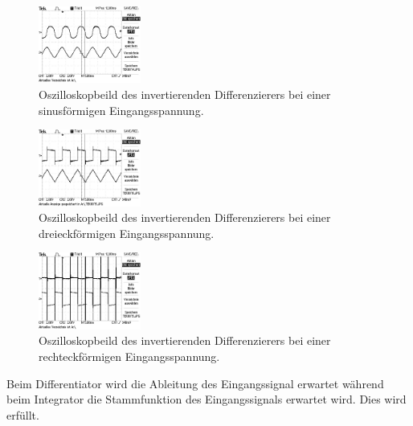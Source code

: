   \begin{figure}
    \centering
    \includegraphics[width=0.3\textwidth,angle=90]{content/grafiken/invertierenderDifferenzierer/TEK0014.JPG}
    \caption{Oszilloskopbeild des invertierenden Differenzierers bei einer sinusförmigen Eingangsspannung.}
    \label{fig:sinusII}
  \end{figure}
  \begin{figure}
    \centering
    \includegraphics[width=0.3\textwidth,angle=90]{content/grafiken/invertierenderDifferenzierer/TEK0016.JPG}
    \caption{Oszilloskopbeild des invertierenden Differenzierers bei einer dreieckförmigen Eingangsspannung.}
    \label{fig:dreieckII}
  \end{figure}
  \begin{figure}
    \centering
    \includegraphics[width=0.3\textwidth,angle=90]{content/grafiken/invertierenderDifferenzierer/TEK0015.JPG}
    \caption{Oszilloskopbeild des invertierenden Differenzierers bei einer rechteckförmigen Eingangsspannung.}
    \label{fig:rechteckII}
  \end{figure}
  Beim Differentiator wird die Ableitung des Eingangssignal erwartet während beim Integrator die Stammfunktion 
  des Eingangssignals erwartet wird. Dies wird erfüllt.


